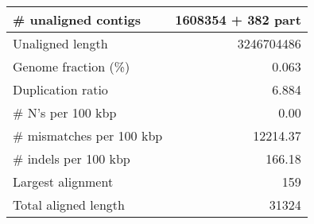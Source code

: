 \documentclass[12pt,a4paper]{article}
\begin{document}
\begin{table}[ht]
\begin{center}
\begin{tabular}{|l*{1}{|r}|}
\# unaligned contigs & 1608354 + 382 part \\ \hline
Unaligned length & 3246704486 \\ \hline
Genome fraction (\%) & 0.063 \\ \hline
Duplication ratio & 6.884 \\ \hline
\# N's per 100 kbp & 0.00 \\ \hline
\# mismatches per 100 kbp & 12214.37 \\ \hline
\# indels per 100 kbp & 166.18 \\ \hline
Largest alignment & 159 \\ \hline
Total aligned length & 31324 \\ \hline
\end{tabular}
\end{center}
\end{table}
\end{document}
